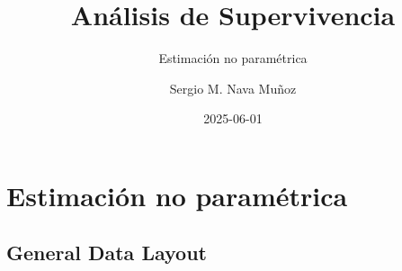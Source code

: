 \documentclass[
]{article}
\title{Análisis de Supervivencia}
\subtitle{Estimación no paramétrica}
\author{Sergio M. Nava Muñoz}
\date{2025-06-01}
\renewcommand*\contentsname{Table of contents}
\newcommand\contentsname{Table of contents}
\begin{document}
\maketitle

\renewcommand*\contentsname{Table of contents}
{
\hypersetup{linkcolor=}
\setcounter{tocdepth}{2}
\tableofcontents
}

\section{Estimación no
paramétrica}\label{estimaciuxf3n-no-paramuxe9trica}

\subsection{General Data Layout}\label{general-data-layout}
\end{document}
